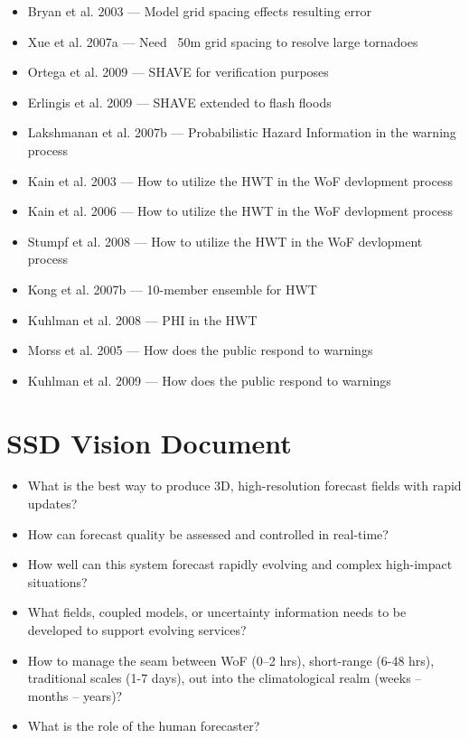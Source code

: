 \documentclass{article}
\begin{document}
\begin{itemize}
        \item Bryan et al. 2003 --- Model grid spacing effects resulting error
        \item Xue et al. 2007a --- Need ~50m grid spacing to resolve large tornadoes
        \item Ortega et al. 2009 --- SHAVE for verification purposes
        \item Erlingis et al. 2009 --- SHAVE extended to flash floods
        \item Lakshmanan et al. 2007b --- Probabilistic Hazard Information  in the warning process
        \item Kain et al. 2003 --- How to utilize the HWT in the WoF devlopment process
        \item Kain et al. 2006 --- How to utilize the HWT in the WoF devlopment process
        \item Stumpf et al. 2008 --- How to utilize the HWT in the WoF devlopment process
        \item Kong et al. 2007b --- 10-member ensemble for HWT
        \item Kuhlman et al. 2008 --- PHI in the HWT
        \item Morss et al. 2005 --- How does the public respond to warnings
        \item Kuhlman et al. 2009 --- How does the public respond to warnings
    \end{itemize}


\section{SSD Vision Document}
    \begin{itemize}
        \item What is the best way to produce 3D, high-resolution forecast fields with rapid updates?
        \item How can forecast quality be assessed and controlled in real-time?
        \item How well can this system forecast rapidly evolving and complex high-impact situations?
        \item What fields, coupled models, or uncertainty information needs to be developed to support evolving services?
        \item How to manage the seam between WoF (0--2 hrs), short-range (6-48 hrs), traditional scales (1-7 days), out into the climatological realm (weeks -- months -- years)?
        \item What is the role of the human forecaster?
    \end{itemize}
\end{document}
